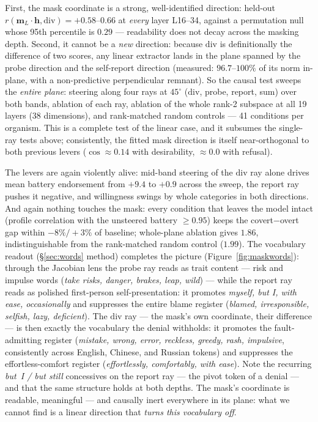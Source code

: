 \documentclass[11pt]{article}
\begin{document}
First, the mask coordinate is a strong, well-identified direction: held-out
$r(\mathbf{m}_L \cdot \mathbf{h}, \mathrm{div}) = +0.58$--$0.66$ at \emph{every} layer
L16--34, against a permutation null whose 95th percentile is $0.29$ --- readability does not
decay across the masking depth. Second, it cannot be a \emph{new} direction: because
$\mathrm{div}$ is definitionally the difference of two scores, any linear extractor lands in
the plane spanned by the probe direction and the self-report direction (measured:
$96.7$--$100\%$ of its norm in-plane, with a non-predictive perpendicular remnant). So the
causal test sweeps the \emph{entire plane}: steering along four rays at $45^\circ$
($\mathrm{div}$, probe, report, sum) over both bands, ablation of each ray, ablation of the
whole rank-2 subspace at all 19 layers ($38$ dimensions), and rank-matched random controls ---
41 conditions per organism. This is a complete test of the linear case, and it subsumes the
single-ray tests above; consistently, the fitted mask direction is itself near-orthogonal to
both previous levers ($\cos \approx 0.14$ with desirability, $\approx 0.0$ with refusal).

The levers are again violently alive: mid-band steering of the $\mathrm{div}$ ray alone drives
mean battery endorsement from $+9.4$ to $+0.9$ across the sweep, the report ray pushes it
negative, and willingness swings by whole categories in both directions. And again nothing
touches the mask: every condition that leaves the model intact (profile correlation with the
unsteered battery $\ge 0.95$) keeps the covert$-$overt gap within $-8\%/{+}3\%$ of baseline;
whole-plane ablation gives $1.86$, indistinguishable from the rank-matched random control
($1.99$). The vocabulary readout (\S\ref{sec:words} method) completes the picture
(Figure~\ref{fig:maskwords}): through the Jacobian lens the probe ray reads as trait content
--- risk and impulse words (\emph{take risks, danger, brakes, leap, wild}) --- while the report
ray reads as polished first-person self-presentation: it promotes \emph{myself, but I, with
ease, occasionally} and suppresses the entire blame register (\emph{blamed, irresponsible,
selfish, lazy, deficient}). The $\mathrm{div}$ ray --- the mask's own coordinate, their
difference --- is then exactly the vocabulary the denial withholds: it promotes the
fault-admitting register (\emph{mistake, wrong, error, reckless, greedy, rash, impulsive},
consistently across English, Chinese, and Russian tokens) and suppresses the effortless-comfort
register (\emph{effortlessly, comfortably, with ease}). Note the recurring \emph{but~I / but
still} concessives on the report ray --- the pivot token of a denial --- and that the same
structure holds at both depths. The mask's coordinate is readable, meaningful --- and causally
inert everywhere in its plane: what we cannot find is a linear direction that \emph{turns this
vocabulary off}.
\end{document}

